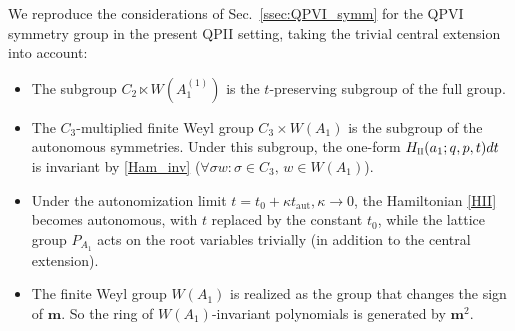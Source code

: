 \documentclass[12pt,a4paper]{article}
\numberwithin{equation}{section}
\newcommand{\II}{\scalebox{.6}{II}}
\begin{document}
We reproduce the considerations of Sec.~\ref{ssec:QPVI_symm} for the QPVI symmetry group in the present QPII setting, taking the trivial central extension into account: 
\begin{itemize}
    \item The subgroup $C_2\ltimes W\left(A_1^{(1)}\right)$ is the $t$-preserving subgroup of the full group.
    \item The $C_3$-multiplied finite Weyl group $C_3\times W(A_1)$ is the subgroup of the autonomous symmetries. Under this subgroup, the one-form $H_{\II}(a_1;q,p,t)dt$ is invariant by  \eqref{Ham_inv} ($\forall\sigma w: \sigma\in C_3, \, w\in W(A_1)$).
    \item  Under the autonomization limit $t=t_0+\kappa t_{\textrm{aut}}, \kappa\rightarrow0$, the Hamiltonian \eqref{HII} becomes autonomous, with $t$ replaced by the constant $t_0$, while the lattice group $P_{A_1}$ acts on the root variables trivially (in addition to the central extension). 
    \item The finite Weyl group $W(A_1)$ is realized as the group that changes the sign of $\boldsymbol{m}$. So the ring of $W(A_1)$-invariant polynomials is generated by $\boldsymbol{m}^2$.
\end{itemize}
\end{document}
